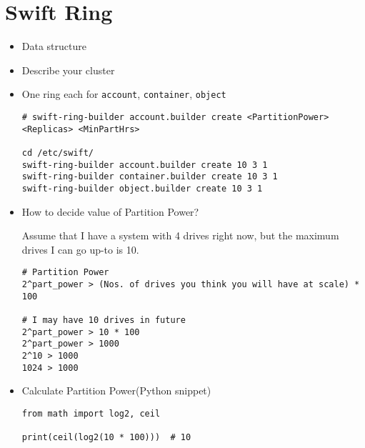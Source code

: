 \documentclass{article}
\begin{document}

\section{Swift Ring}
\label{sec-3}
\begin{itemize}
\item Data structure
\item Describe your cluster
\item One ring each for \texttt{account}, \texttt{container}, \texttt{object}
\begin{verbatim}
# swift-ring-builder account.builder create <PartitionPower> <Replicas> <MinPartHrs>

cd /etc/swift/
swift-ring-builder account.builder create 10 3 1
swift-ring-builder container.builder create 10 3 1
swift-ring-builder object.builder create 10 3 1
\end{verbatim}

\item How to decide value of Partition Power?

Assume that I have a system with 4 drives right now, but the
maximum drives I can go up-to is 10.
\begin{verbatim}
# Partition Power
2^part_power > (Nos. of drives you think you will have at scale) * 100

# I may have 10 drives in future
2^part_power > 10 * 100
2^part_power > 1000
2^10 > 1000
1024 > 1000
\end{verbatim}

\item Calculate Partition Power(Python snippet)
\begin{verbatim}
from math import log2, ceil

print(ceil(log2(10 * 100)))  # 10
\end{verbatim}
\end{itemize}
\end{document}
